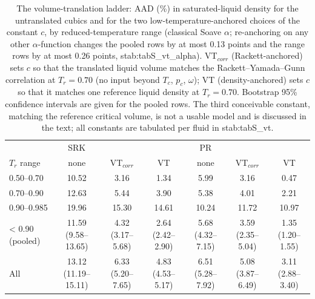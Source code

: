 \begin{table}[H]
\centering
\caption{The volume-translation ladder: AAD (\%) in saturated-liquid density for the untranslated cubics and for the two low-temperature-anchored choices of the constant $c$, by reduced-temperature range (classical Soave $\alpha$; re-anchoring on any other $\alpha$-function changes the pooled rows by at most 0.13 points and the range rows by at most 0.26 points, {stab:tabS_vt_alpha}). VT$_{corr}$ (Rackett-anchored) sets $c$ so that the translated liquid volume matches the Rackett--Yamada--Gunn correlation at $T_r = 0.70$ (no input beyond $T_c$, $p_c$, $\omega$); VT (density-anchored) sets $c$ so that it matches one reference liquid density at $T_r = 0.70$. Bootstrap 95\% confidence intervals are given for the pooled rows. The third conceivable constant, matching the reference critical volume, is not a usable model and is discussed in the text; all constants are tabulated per fluid in {stab:tabS_vt}.}
\label{tab:tab_ladder}
\small
\begin{tabular}{lcccccc}
\toprule
 & SRK &  &  & PR &  &  \\
$T_r$ range & none & VT$_{corr}$ & VT & none & VT$_{corr}$ & VT \\
\midrule
0.50–0.70 & 10.52 & 3.16 & 1.34 & 5.99 & 3.16 & 0.47 \\
0.70–0.90 & 12.63 & 5.44 & 3.90 & 5.38 & 4.01 & 2.21 \\
0.90–0.985 & 19.96 & 15.30 & 14.61 & 10.24 & 11.72 & 10.97 \\
< 0.90 (pooled) & 11.59 (9.58--13.65) & 4.32 (3.17--5.68) & 2.64 (2.42--2.90) & 5.68 (4.32--7.15) & 3.59 (2.35--5.04) & 1.35 (1.20--1.55) \\
All & 13.12 (11.19--15.11) & 6.33 (5.20--7.65) & 4.83 (4.53--5.17) & 6.51 (5.28--7.92) & 5.08 (3.87--6.49) & 3.11 (2.88--3.40) \\
\bottomrule
\end{tabular}
\end{table}

